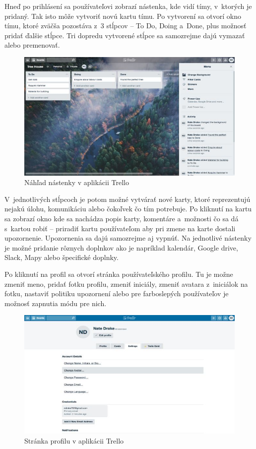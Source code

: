 \indent Hneď po prihlásení sa používateľovi zobrazí nástenka, kde vidí tímy, v ktorých je pridaný. Tak isto môže vytvoriť novú kartu tímu. Po vytvorení sa otvorí okno tímu, ktoré zväčša pozostáva z 3 stĺpcov – To Do, Doing a Done, plus možnosť pridať ďalšie stĺpce. Tri dopredu vytvorené stĺpce sa samozrejme dajú vymazať alebo premenovať. 

\begin{figure}[H]
    \centering
    \includegraphics[scale=0.65]{img/obr-trello.jpg}
    \caption{Náhľad nástenky v aplikácii Trello}
    \label{fig:nastenka}
\end{figure}

\indent V jednotlivých stĺpcoch je potom možné vytvárať nové karty, ktoré reprezentujú nejakú úlohu, komunikáciu alebo čokoľvek čo tím potrebuje. Po kliknutí na kartu sa zobrazí okno kde sa nachádza popis karty, komentáre a možnosti čo sa dá s kartou robiť – priradiť kartu používateľom aby pri zmene na karte dostali upozornenie. Upozornenia sa dajú samozrejme aj vypnúť. Na jednotlivé nástenky je možné pridanie rôznych doplnkov ako je napríklad kalendár, Google drive, Slack, Mapy alebo špecifické doplnky. 

\indent Po kliknutí na profil sa otvorí stránka používateľského profilu. Tu je možne zmeniť meno, pridať fotku profilu, zmeniť iniciály, zmeniť avatara z iniciálok na fotku, nastaviť politiku upozornení alebo pre farboslepých používateľov je možnosť zapnutia módu pre nich. 

\begin{figure}[H]
    \centering
    \includegraphics[scale=0.65]{img/obr-trello-profil.jpg}
    \caption{Stránka profilu v aplikácii Trello}
    \label{fig:profil}
\end{figure}

